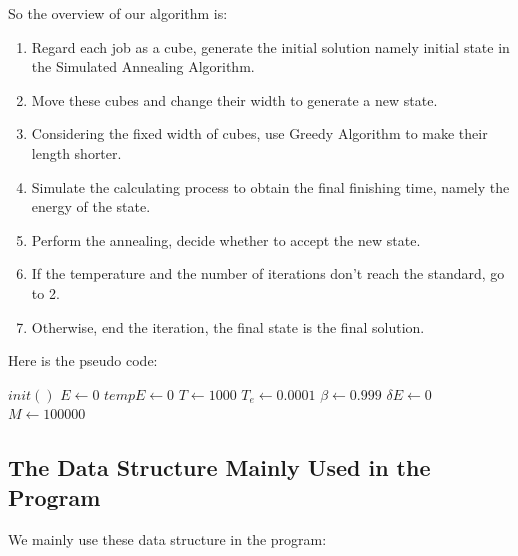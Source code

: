 \documentclass{llncs}
\begin{document}
	So the overview of our algorithm is:
	\begin{enumerate}
		\item Regard each job as a cube, generate the initial solution namely initial state in the Simulated Annealing Algorithm. 
		\item Move these cubes and change their width to generate a new state. 
		\item Considering the fixed width of cubes, use Greedy Algorithm to make their length shorter. 
		\item Simulate the calculating process to obtain the final finishing time, namely the energy of the state. 
		\item Perform the annealing, decide whether to accept the new state.
		\item If the temperature and the number of iterations don't reach the standard, go to 2.
		\item Otherwise, end the iteration, the final state is the final solution. 
	\end{enumerate}
 	
 	Here is the pseudo code: \\
 	\begin{algorithm}[H]
 		\BlankLine
 		\caption{$schedule()$} \label{Alg-schedule}
 		$init()$\; 
 		$E \leftarrow 0$\; 
 		$tempE \leftarrow 0$\; 
 		$T \leftarrow 1000$\; 
 		$T_e \leftarrow 0.0001$\; 
 		$\beta \leftarrow 0.999$\; 
 		$\delta E \leftarrow 0$\; 
 		$M \leftarrow 100000$\; 
 	\end{algorithm}
	
	\subsection{The Data Structure Mainly Used in the Program} \label{subsec-data}
	We mainly use these data structure in the program: 
	
\end{document}
